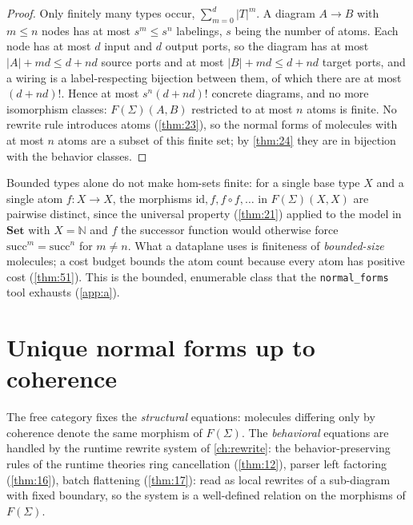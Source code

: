 \begin{proof}
Only finitely many types occur, $\sum_{m=0}^{d}|T|^m$. A diagram $A \to B$
with $m \le n$ nodes has at most $s^m \le s^n$ labelings, $s$ being the
number of atoms. Each node has at most $d$ input and $d$ output ports,
so the diagram has at most $|A| + md \le d + nd$ source ports and at most
$|B| + md \le d + nd$ target ports, and a wiring is a label-respecting
bijection between them, of which there are at most $(d + nd)!$. Hence at most
$s^n (d + nd)!$ concrete diagrams, and no more isomorphism classes:
$F (\Sigma)(A,B)$ restricted to at most $n$ atoms is finite. No rewrite rule
introduces atoms (\autoref{thm:23}), so the normal forms of molecules with at most $n$
atoms are a subset of this finite set; by \autoref{thm:24} they are in bijection with the
behavior classes.
\end{proof}

\begin{remark}\label{rem:thm22-bound}
Bounded types alone do not make hom-sets finite: for a single base type $X$
and a single atom $f \colon X \to X$, the morphisms $\mathrm{id}, f,
f \circ f, \dots$ in $F (\Sigma)(X,X)$ are pairwise distinct, since the
universal property (\autoref{thm:21}) applied to the model in $\mathbf{Set}$ with
$X = \mathbb{N}$ and $f$ the successor function would otherwise force
$\mathrm{succ}^m = \mathrm{succ}^n$ for $m \neq n$. What a dataplane uses is
finiteness of \emph{bounded-size} molecules; a cost budget bounds the atom
count because every atom has positive cost (\autoref{thm:51}). This is the bounded,
enumerable class that the \texttt{normal\_forms} tool exhausts
(\autoref{app:a}).
\end{remark}

\section{Unique normal forms up to coherence}\label{sec:free-normal}

The free category fixes the \emph{structural} equations: molecules differing
only by coherence denote the same morphism of $F (\Sigma)$. The
\emph{behavioral} equations are handled by the runtime rewrite system of
\autoref{ch:rewrite}: the behavior-preserving rules of the runtime theories
ring cancellation (\autoref{thm:12}), parser left factoring (\autoref{thm:16}), batch flattening
(\autoref{thm:17}): read as local rewrites of a sub-diagram with fixed boundary, so
the system is a well-defined relation on the morphisms of $F (\Sigma)$.

